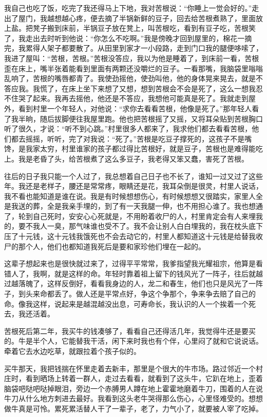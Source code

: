 \documentclass[12pt,UTF8]{ctexbook}
\begin{document}
我自己也吃了饭，吃完了我还得马上下地，我对苦根说：“你睡上一觉会好的。”走出了屋门，我越想越心疼，便去摘了半锅新鲜的豆子，回去给苦根煮熟了，里面放上盐。把凳子搬到床前，半锅豆子放在凳上，叫苦根吃，看到有豆子吃，苦根笑了，我走出去时听到他说：“你怎么不吃啊。”我是傍晚才回到屋里的，棉花一摘完，我累得人架子都要散了。从田里到家才一小段路，走到门口我的腿便哆嗦了，我进了屋叫：“苦根，苦根。”苦根没答应，我以为他是睡着了，到床前一看，苦根歪在床上，嘴半张着能看到里面有两颗还没嚼烂的豆子。一看那嘴，我脑袋里嗡嗡乱响了，苦根的嘴唇都青了。我使劲摇他，使劲叫他，他的身体晃来晃去，就是不答应我。我慌了，在床上坐下来想了又想，想到苦根会不会是死了，这么一想我忍不住哭了起来。我再去摇他，他还是不答应，我想他可能真是死了。我就走到屋外，看到村里一个年轻人，对他说：“求你去看看苦根，他像是死了。”那年轻人看了我半晌，随后拔脚便往我屋里跑。他也把苦根摇了又摇，又将耳朵贴到苦根胸口听了很久，才说：“听不到心跳。”村里很多人都来了，我求他们都去看看苦根，他们都去摇摇，听听，完了对我说：“死了。”苦根是吃豆子撑死的，这孩子不是嘴馋，是我家太穷，村里谁家的孩子都过得比苦根好，就是豆子，苦根也是难得能吃上。我是老昏了头，给苦根煮了这么多豆子，我老得又笨又蠢，害死了苦根。

往后的日子我只能一个人过了，我总想着自己日子也不长了，谁知一过又过了这些年。我还是老样子，腰还是常常疼，眼睛还是花，我耳朵倒是很灵，村里人说话，我不看也能知道是谁在说。我是有时候想想伤心，有时候想想又很踏实，家里人全是我送的葬，全是我亲手埋的，到了有一天我腿一伸，也不用担心谁了。我也想通了，轮到自己死时，安安心心死就是，不用盼着收尸的人，村里肯定会有人来埋我的，要不我人一臭，那气味谁也受不了。我不会让别人白白埋我的，我在枕头底下压了十元钱，这十元钱我饿死也不会去动它的，村里人都知道这十元钱是给替我收尸的那个人，他们也都知道我死后是要和家珍他们埋在一起的。

这辈子想起来也是很快就过来了，过得平平常常，我爹指望我光耀祖宗，他算是看错人了，我啊，就是这样的命。年轻时靠着祖上留下的钱风光了一阵子，往后就越过越落魄了，这样反倒好，看看我身边的人，龙二和春生，他们也只是风光了一阵子，到头来命都丢了。做人还是平常点好，争这个争那个，争来争去赔了自己的命。像我这样，说起来是越混越没出息，可寿命长，我认识的人一个挨着一个死去，我还活着。

苦根死后第二年，我买牛的钱凑够了，看看自己还得活几年，我觉得牛还是要买的。牛是半个人，它能替我干活，闲下来时我也有个伴，心里闷了就和它说说话。牵着它去水边吃草，就跟拉着个孩子似的。

买牛那天，我把钱揣在怀里走着去新丰，那里是个很大的牛市场。路过邻近一个村庄时，看到晒场上转着一群人，走过去看看，就看到了这头牛，它趴在地上，歪着脑袋吧哒吧哒掉眼泪，旁边一个赤膊男人蹲在地上霍霍地磨着牛刀，围着的人在说牛刀从什么地方刺进去最好。我看到这头老牛哭得那么伤心，心里怪难受的。想想做牛真是可怜。累死累活替人干了一辈子，老了，力气小了，就要被人宰了吃掉。
\end{document}
